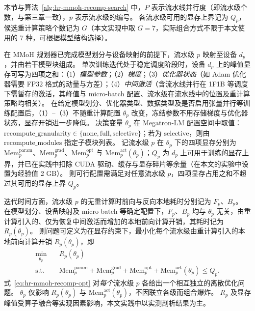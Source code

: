 本节与算法~\ref{alg:hr-mmoh-recomp-search} 中，$P$ 表示流水线并行度（即流水级个数，与第三章一致），$p$ 表示流水级的编号。
各流水级可用的显存上界记为 $Q_p$，候选重计算策略个数记为 $G$（本文实现中取 $G{=}7$，实际组合方式不限于本文使用的 7 种，可根据模型结构选择）。

在 MMoH 规划器已完成模型划分与设备映射的前提下，流水级 $p$ 映射至设备 $d_p$，并由若干模型块组成。
单次训练迭代处于稳定调度阶段时，设备 $d_p$ 上的峰值显存可写为四项之和：（1）\emph{模型参数}；（2）\emph{梯度}；（3）\emph{优化器状态}（如 Adam 优化器需要 FP32 格式的动量与方差）；（4）\emph{中间激活}（含流水线并行在 1F1B 等调度下需暂存的激活，其峰值与 micro-batch 配置、流水级在流水线中的位置及重计算策略均相关）。
在给定模型划分、优化器类型、数据类型及是否启用张量并行等训练配置后，（1）--（3）不随重计算配置 $\theta_p$ 改变，冻结参数不用存储梯度与优化器状态，显存开销进一步降低。
决策变量 $\theta_p$ 在 Megatron-LM 配置空间中取值：$\text{recompute\_granularity} \in \{\text{none}, \text{full}, \text{selective}\}$；若为 $\text{selective}$，则由 $\text{recompute\_modules}$ 指定子模块列表。
记流水级 $p$ 在 $\theta_p$ 下的四项显存分别为 $\mathrm{Mem}_p^{\mathrm{param}}$、$\mathrm{Mem}_p^{\mathrm{grad}}$、$\mathrm{Mem}_p^{\mathrm{opt}}$ 与 $\mathrm{Mem}_p^{\mathrm{act}}(\theta_p)$；$Q_p$ 为 $d_p$ 上可用于训练的显存上界，并已在实践中扣除 CUDA 驱动、缓存与显存碎片等余量（在本文的实验中设置为经验值 2 GB）。
则可行配置需满足对任意流水级 $p$，四项显存占用之和不超过其可用的显存上界 $Q_p$。

迭代时间方面，流水级 $p$ 的无重计算时前向与反向本地耗时分别记为 $F_p$、$B_p$。
在模型划分、设备映射及 micro-batch 等确定配置下，$F_p$、$B_p$ 均与 $\theta_p$ 无关，由重计算引入的、仅为恢复中间激活而增加的本地前向计算开销，其耗时记为 $R_p(\theta_p)$。
则问题可定义为在显存约束下，最小化每个流水级由重计算引入的本地前向计算开销 $R_p(\theta_p)$，即
\begin{equation}
  \label{eq:hr-mmoh-recomp-opt}
  \begin{aligned}
    \min_{\theta_p} \quad & R_p(\theta_p) \\
    \text{s.t.} \quad & \mathrm{Mem}_p^{\mathrm{param}} + \mathrm{Mem}_p^{\mathrm{grad}} + \mathrm{Mem}_p^{\mathrm{opt}} + \mathrm{Mem}_p^{\mathrm{act}}(\theta_p) \le Q_p.
  \end{aligned}
\end{equation}
式~\eqref{eq:hr-mmoh-recomp-opt} 对\emph{每个}流水级 $p$ 各给出一个相互独立的离散优化问题。
$\theta_p$ 仅影响 $R_p(\theta_p)$ 与 $\mathrm{Mem}_p^{\mathrm{act}}(\theta_p)$，不因联立各级而组合爆炸。
$R_p$ 及显存峰值受算子融合等实现因素影响，本文实践中以实测剖析结果为主。

